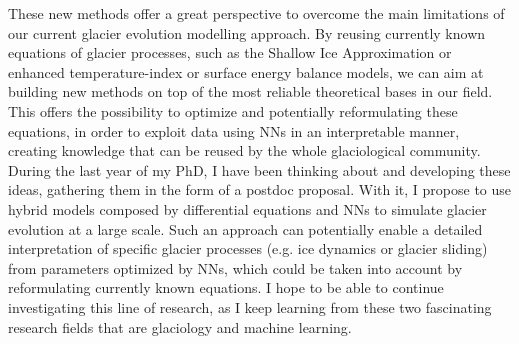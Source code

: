 These new methods offer a great perspective to overcome the main limitations of our current glacier evolution modelling approach. By reusing currently known equations of glacier processes, such as the Shallow Ice Approximation \citep{hutter_theoretical_1983} or enhanced temperature-index or surface energy balance models, we can aim at building new methods on top of the most reliable theoretical bases in our field. This offers the possibility to optimize and potentially reformulating these equations, in order to exploit data using NNs in an interpretable manner, creating knowledge that can be reused by the whole glaciological community. During the last year of my PhD, I have been thinking about and developing these ideas, gathering them in the form of a postdoc proposal. With it, I propose to use hybrid models composed by differential equations and NNs to simulate glacier evolution at a large scale. Such an approach can potentially enable a detailed interpretation of specific glacier processes (e.g. ice dynamics or glacier sliding) from parameters optimized by NNs, which could be taken into account by reformulating currently known equations. I hope to be able to continue investigating this line of research, as I keep learning from these two fascinating research fields that are glaciology and machine learning. 

